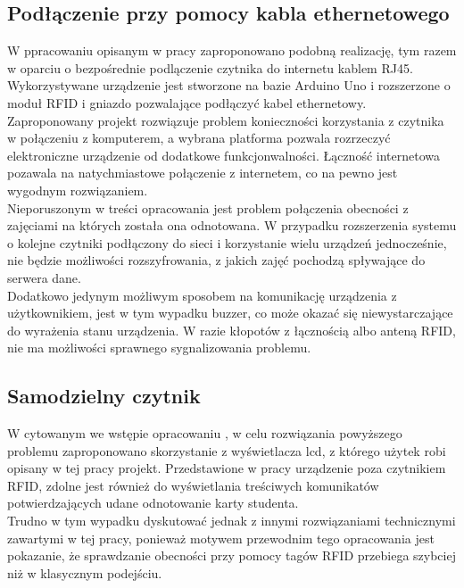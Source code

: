 \documentclass[declaration,shortabstract, mgr]{iithesis}
\begin{document}
\subsection{Podłączenie przy pomocy kabla ethernetowego}
\indent W ppracowaniu opisanym w pracy \cite{rfid_serial} zaproponowano podobną realizację, tym razem w oparciu o bezpośrednie podlączenie czytnika do internetu kablem RJ45. Wykorzystywane urządzenie jest stworzone na bazie Arduino Uno i rozszerzone o moduł RFID i gniazdo pozwalające podłączyć kabel ethernetowy. \\
\indent Zaproponowany projekt rozwiązuje problem konieczności korzystania z czytnika w połączeniu z komputerem, a wybrana platforma pozwala rozrzeczyć elektroniczne urządzenie od dodatkowe funkcjonwalności. Łączność internetowa pozawala na natychmiastowe połączenie z internetem, co na pewno jest wygodnym rozwiązaniem. \\
\indent Nieporuszonym w treści opracowania jest problem połączenia obecności z zajęciami na których została ona odnotowana. W przypadku rozszerzenia systemu o kolejne czytniki podłączony do sieci i korzystanie wielu urządzeń jednocześnie, nie będzie możliwości rozszyfrowania, z jakich zajęć pochodzą spływające do serwera dane. \\
\indent Dodatkowo jedynym możliwym sposobem na komunikację urządzenia z użytkownikiem, jest w tym wypadku buzzer, co może okazać się niewystarczające do wyrażenia stanu urządzenia. W razie kłopotów z łącznością albo anteną RFID, nie ma możliwości sprawnego sygnalizowania problemu.

\subsection{Samodzielny czytnik }
\indent W cytowanym we wstępie opracowaniu \cite{lcd}, w celu rozwiązania powyższego problemu zaproponowano skorzystanie z wyświetlacza lcd, z którego użytek robi opisany w tej pracy projekt. Przedstawione w pracy urządzenie poza czytnikiem RFID, zdolne jest również do wyświetlania treściwych komunikatów potwierdzających udane odnotowanie karty studenta. \\
\indent Trudno w tym wypadku dyskutować jednak z innymi rozwiązaniami technicznymi zawartymi w tej pracy, ponieważ motywem przewodnim tego opracowania jest pokazanie, że sprawdzanie obecności przy pomocy tagów RFID przebiega szybciej niż w klasycznym podejściu.
\end{document}
